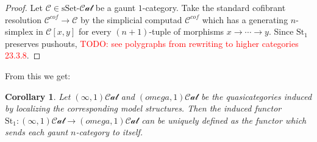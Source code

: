 \documentclass[12pt]{article}
\newtheorem{corollary}[theorem]{Corollary}
\theoremstyle{definition}
\newcommand{\TODO}[1]{\textcolor{red}{TODO: {#1}}}
\newcommand{\C}{\mathcal{C}}
\newcommand{\ssetcat}{\text{sSet}\text{-}\mathcal{Cat}}
\newcommand{\st}{\text{St}}
\begin{document}
	\begin{proof}
		Let $\C \in \ssetcat$ be a gaunt $1$-category. Take the standard cofibrant resolution $\C^{cof} \to \C$ by the simplicial computad $\C^{cof}$ which has a generating $n$-simplex in $\C[x,y]$ for every $(n+1)$-tuple of morphisms $x \to \cdots \to y$. Since $\st_1$ preserves pushouts, 
		\TODO{see polygraphs from rewriting to higher categories 23.3.8}.
	\end{proof}
	From this we get:
	\begin{corollary}
		Let $(\infty,1)\mathcal{Cat}$ and $(omega,1)\mathcal{Cat}$ be the quasicategories induced by localizing the corresponding model structures. Then the induced functor $\st_1 :(\infty,1)\mathcal{Cat} \to (omega,1)\mathcal{Cat}$ can be uniquely defined as the functor which sends each gaunt $n$-category to itself.
	\end{corollary}
	
\end{document}

